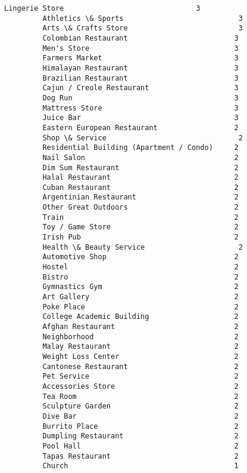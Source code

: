 \documentclass[11pt]{article}
\begin{document}
\begin{Verbatim}[commandchars=\\\{\}]
         Lingerie Store                               3
         Athletics \& Sports                           3
         Arts \& Crafts Store                          3
         Colombian Restaurant                         3
         Men's Store                                  3
         Farmers Market                               3
         Himalayan Restaurant                         3
         Brazilian Restaurant                         3
         Cajun / Creole Restaurant                    3
         Dog Run                                      3
         Mattress Store                               3
         Juice Bar                                    3
         Eastern European Restaurant                  2
         Shop \& Service                               2
         Residential Building (Apartment / Condo)     2
         Nail Salon                                   2
         Dim Sum Restaurant                           2
         Halal Restaurant                             2
         Cuban Restaurant                             2
         Argentinian Restaurant                       2
         Other Great Outdoors                         2
         Train                                        2
         Toy / Game Store                             2
         Irish Pub                                    2
         Health \& Beauty Service                      2
         Automotive Shop                              2
         Hostel                                       2
         Bistro                                       2
         Gymnastics Gym                               2
         Art Gallery                                  2
         Poke Place                                   2
         College Academic Building                    2
         Afghan Restaurant                            2
         Neighborhood                                 2
         Malay Restaurant                             2
         Weight Loss Center                           2
         Cantonese Restaurant                         2
         Pet Service                                  2
         Accessories Store                            2
         Tea Room                                     2
         Sculpture Garden                             2
         Dive Bar                                     2
         Burrito Place                                2
         Dumpling Restaurant                          2
         Pool Hall                                    2
         Tapas Restaurant                             2
         Church                                       1

\end{Verbatim}
\end{document}

